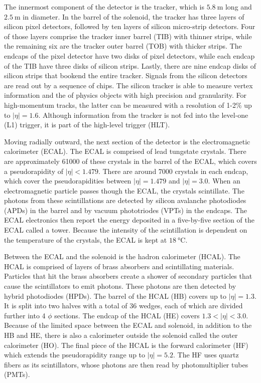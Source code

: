 The innermost component of the detector is the tracker, which is $\SI{5.8}{\m}$ long and $\SI{2.5}{\m}$ in diameter. In the barrel of the solenoid, the tracker has three layers of silicon pixel detectors, followed by ten layers of silicon micro-strip detectors. Four of those layers comprise the tracker inner barrel (TIB) with thinner strips, while the remaining six are the tracker outer barrel (TOB) with thicker strips. The endcaps of the pixel detector have two disks of pixel detectors, while each endcap of the TIB have three disks of silicon strips. Lastly, there are nine endcap disks of silicon strips that bookend the entire tracker. Signals from the silicon detectors are read out by a sequence of chips.
The silicon tracker is able to measure vertex information and the \pt of physics objects with high precision and granularity. For high-momentum tracks, the latter can be measured with a resolution of 1-2\% up to $|\eta| = 1.6$. Although information from the tracker is not fed into the level-one (L1) trigger, it is part of the high-level trigger (HLT).

Moving radially outward, the next section of the detector is the electromagnetic calorimeter (ECAL). The ECAL is comprised of lead tungstate crystals. There are approximately 61000 of these crystals in the barrel of the ECAL, which covers a pseudorapidity of $|\eta| < 1.479$. There are around $7000$ crystals in each endcap, which cover the pseudorapidities between $|\eta| = 1.479$ and $|\eta| = 3.0$. When an electromagnetic particle passes though the ECAL, the crystals scintillate. The photons from these scintillations are detected by silicon avalanche photodiodes (APDs) in the barrel and by vacuum phototriodes (VPTs) in the endcaps. The ECAL electronics then report the energy deposited in a five-by-five section of the ECAL called a tower. Because the intensity of the scintillation is dependent on the temperature of the crystals, the ECAL is kept at $\SI{18}{\degreeCelsius}$.

Between the ECAL and the solenoid is the hadron calorimeter (HCAL). The HCAL is comprised of layers of brass absorbers and scintillating materials. Particles that hit the brass absorbers create a shower of secondary particles that cause the scintillators to emit photons. These photons are then detected by hybrid photodiodes (HPDs). The barrel of the HCAL (HB) covers up to $|\eta| = 1.3$. It is split into two halves with a total of 36 wedges, each of which are divided further into 4 $\phi$ sections. The endcap of the HCAL (HE) covers $1.3 < |\eta| < 3.0$. Because of the limited space between the ECAL and solenoid, in addition to the HB and HE, there is also a calorimeter outside the solenoid called the outer calorimeter (HO). The final piece of the HCAL is the forward calorimeter (HF) which extends the pseudorapidity range up to $|\eta| = 5.2$. The HF uses quartz fibers as its scintillators, whose photons are then read by photomultiplier tubes (PMTs).

